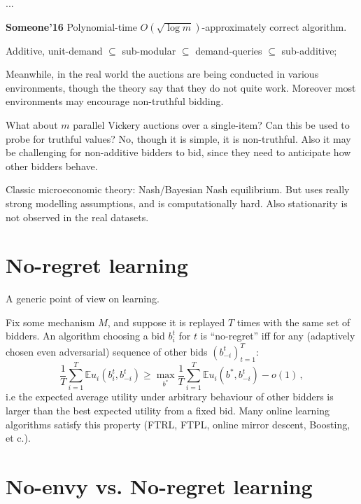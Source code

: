\documentclass[a4paper]{article}
\newcommand{\ex}{\mathbb{E}}
\begin{document}
\noindent ...

\textbf{Someone'16} Polynomial-time $O(\sqrt{\log m})$-approximately correct
algorithm.

Additive, unit-demand $\subseteq$ sub-modular
$\subseteq$ demand-queries
$\subseteq$ sub-additive;

Meanwhile, in the real world the auctions are being conducted in various environments,
though the theory say that they do not quite work. Moreover most environments may encourage
non-truthful bidding.

What about $m$ parallel Vickery auctions over a single-item? Can this be used to
probe for truthful values? No, though it is simple, it is non-truthful. Also it may
be challenging for non-additive bidders to bid, since they need to anticipate how
other bidders behave.

Classic microeconomic theory: Nash/Bayesian Nash equilibrium. But uses really strong
modelling assumptions, and is computationally hard. Also stationarity is not observed
in the real datasets.


\section{No-regret learning} %
\label{sec:no_regret_learning}
\noindent A generic point of view on learning.

Fix some mechanism $M$, and suppose it is replayed $T$ times with the same set of
bidders. An algorithm choosing a bid $b_i^t$ for $t$ is ``no-regret'' iff for any
(adaptively chosen even adversarial) sequence of other bids $(b_{-i}^t)_{t=1}^T$:
\begin{equation}
	\frac{1}{T} \sum_{i=1}^T \ex u_i(b_i^t, b_{-i}^t)
		\geq \max_{b^*} \frac{1}{T} \sum_{i=1}^T \ex u_i(b^*, b_{-i}^t) - o(1)
		\,,
\end{equation}
i.e the expected average utility under arbitrary behaviour of other bidders is larger
than the best expected utility from a fixed bid. Many online learning algorithms satisfy
this property (FTRL, FTPL, online mirror descent, Boosting, et c.).



\section{No-envy vs. No-regret learning} %
\label{sec:no_envy_vs_no_regret_learning}
\end{document}

